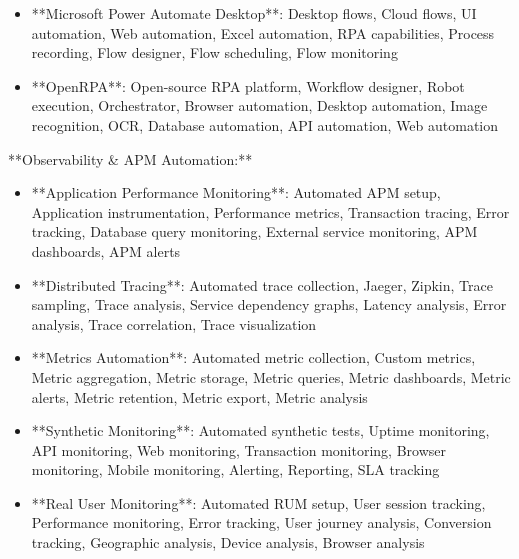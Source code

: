 \documentclass[11pt,a4paper]{article}
\begin{document}
\begin{itemize}
\item **Microsoft Power Automate Desktop**: Desktop flows, Cloud flows, UI automation, Web automation, Excel automation, RPA capabilities, Process recording, Flow designer, Flow scheduling, Flow monitoring
\end{itemize}

\begin{itemize}
\item **OpenRPA**: Open-source RPA platform, Workflow designer, Robot execution, Orchestrator, Browser automation, Desktop automation, Image recognition, OCR, Database automation, API automation, Web automation
\end{itemize}

**Observability \& APM Automation:**

\begin{itemize}
\item **Application Performance Monitoring**: Automated APM setup, Application instrumentation, Performance metrics, Transaction tracing, Error tracking, Database query monitoring, External service monitoring, APM dashboards, APM alerts
\end{itemize}

\begin{itemize}
\item **Distributed Tracing**: Automated trace collection, Jaeger, Zipkin, Trace sampling, Trace analysis, Service dependency graphs, Latency analysis, Error analysis, Trace correlation, Trace visualization
\end{itemize}

\begin{itemize}
\item **Metrics Automation**: Automated metric collection, Custom metrics, Metric aggregation, Metric storage, Metric queries, Metric dashboards, Metric alerts, Metric retention, Metric export, Metric analysis
\end{itemize}

\begin{itemize}
\item **Synthetic Monitoring**: Automated synthetic tests, Uptime monitoring, API monitoring, Web monitoring, Transaction monitoring, Browser monitoring, Mobile monitoring, Alerting, Reporting, SLA tracking
\end{itemize}

\begin{itemize}
\item **Real User Monitoring**: Automated RUM setup, User session tracking, Performance monitoring, Error tracking, User journey analysis, Conversion tracking, Geographic analysis, Device analysis, Browser analysis
\end{itemize}
\end{document}
